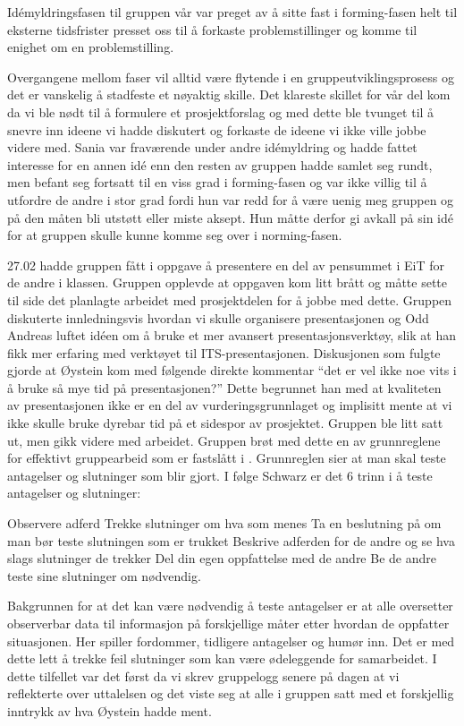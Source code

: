 \documentclass[a4paper,norsk,oneside]{article}
\begin{document}
Idémyldringsfasen til gruppen vår var preget av å sitte fast i forming-fasen helt til eksterne tidsfrister presset oss til å forkaste problemstillinger og komme til enighet om en problemstilling. 

Overgangene mellom faser vil alltid være flytende i en gruppeutviklingsprosess og det er vanskelig å stadfeste et nøyaktig skille. Det klareste skillet for vår del kom da vi ble nødt til å formulere et prosjektforslag og med dette ble tvunget til å snevre inn ideene vi hadde diskutert og forkaste de ideene vi ikke ville jobbe videre med. Sania var fraværende under andre idémyldring og hadde fattet interesse for en annen idé enn den resten av gruppen hadde samlet seg rundt, men befant seg fortsatt til en viss grad i forming-fasen og var ikke villig til å utfordre de andre i stor grad fordi hun var redd for å være uenig meg gruppen og på den måten bli utstøtt eller miste aksept. Hun måtte derfor gi avkall på sin idé for at gruppen skulle kunne komme seg over i norming-fasen.

27.02 hadde gruppen fått i oppgave å presentere en del av pensummet i EiT for de andre i klassen. Gruppen opplevde at oppgaven kom litt brått og måtte sette til side det planlagte arbeidet med prosjektdelen for å jobbe med dette. Gruppen diskuterte innledningsvis hvordan vi skulle organisere presentasjonen og Odd Andreas luftet idéen om å bruke et mer avansert presentasjonsverktøy, slik at han fikk mer erfaring med verktøyet til ITS-presentasjonen. Diskusjonen som fulgte gjorde at Øystein kom med følgende direkte kommentar “det er vel ikke noe vits i å bruke så mye tid på presentasjonen?” Dette begrunnet han med at kvaliteten av presentasjonen ikke er en del av vurderingsgrunnlaget og implisitt mente at vi ikke skulle bruke dyrebar tid på et sidespor av prosjektet. Gruppen ble litt satt ut, men gikk videre med arbeidet. Gruppen brøt med dette en av grunnreglene for effektivt gruppearbeid som er fastslått i \cite{schwarz}. Grunnreglen sier at man skal teste antagelser og slutninger som blir gjort. I følge Schwarz er det 6 trinn i å teste antagelser og slutninger:

Observere adferd
Trekke slutninger om hva som menes
Ta en beslutning på om man bør teste slutningen som er trukket
Beskrive adferden for de andre og se hva slags slutninger de trekker
Del din egen oppfattelse med de andre
Be de andre teste sine slutninger om nødvendig.

Bakgrunnen for at det kan være nødvendig å teste antagelser er at alle oversetter observerbar data til informasjon på forskjellige måter etter hvordan de oppfatter situasjonen. Her spiller fordommer, tidligere antagelser og humør inn. Det er med dette lett å trekke feil slutninger som kan være ødeleggende for samarbeidet. I dette tilfellet var det først da vi skrev gruppelogg senere på dagen at vi reflekterte over uttalelsen og det viste seg at alle i gruppen satt med et forskjellig inntrykk av hva Øystein hadde ment.
\end{document}
